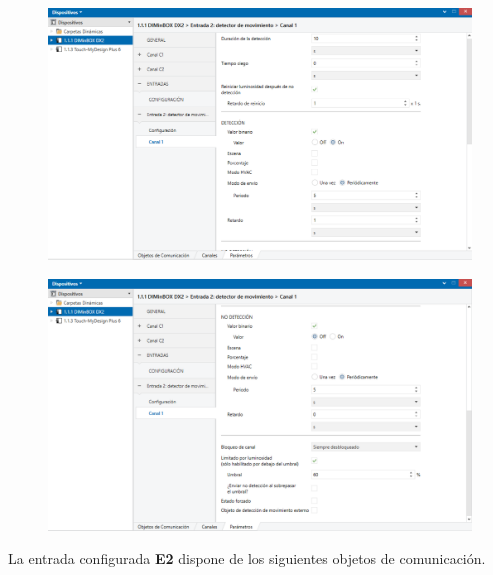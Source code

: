 \documentclass[10pt]{article}
\begin{document}
\begin{figure}[H]
	\begin{center}
	 		\includegraphics[width = 1.00\textwidth]{Imagenes/img15}
	\end{center} 
\end{figure}

\begin{figure}[H]
	\begin{center}
	 		\includegraphics[width = 1.00\textwidth]{Imagenes/img16}
	\end{center} 
\end{figure}

La entrada configurada \textbf{E2} dispone de los siguientes objetos de comunicación. \\
\end{document}
